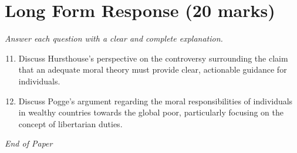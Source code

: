 \documentclass[12pt]{article}
\begin{document}
\section*{Long Form Response (20 marks)}
\textit{Answer each question with a clear and complete explanation.}
\begin{enumerate}[label=\arabic*.]
\setcounter{enumi}{10}
\item Discuss Hursthouse's perspective on the controversy surrounding the claim that an adequate moral theory must provide clear, actionable guidance for individuals.
\item Discuss Pogge's argument regarding the moral responsibilities of individuals in wealthy countries towards the global poor, particularly focusing on the concept of libertarian duties.
\end{enumerate}

\vfill
\noindent\textit{End of Paper}
\end{document}
